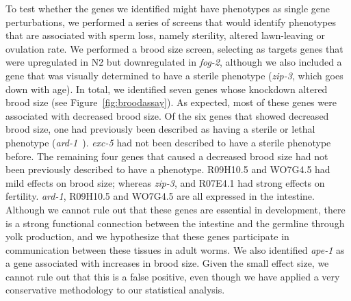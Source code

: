 \documentclass[10pt,letterpaper,twocolumn]{article}
\newcommand{\fog}{\emph{fog-2}}
\begin{document}
To test whether the genes we identified might have phenotypes as single gene perturbations, we performed a series of screens that would identify phenotypes that are associated with sperm loss, namely sterility, altered lawn-leaving or ovulation rate.
We performed a brood size screen, selecting as targets genes that were upregulated in N2 but downregulated in \fog{}, although we also included a gene that was visually determined to have a sterile phenotype (\emph{zip-3}, which goes down with age). In total, we identified seven genes whose knockdown altered brood size (see Figure~\ref{fig:broodassay}). As expected, most of these genes were associated with decreased brood size. Of the six genes that showed decreased brood size, one had previously been described as having a sterile or lethal phenotype (\emph{ard-1}~\cite{Simmer2003}). \emph{exc-5} had not been described to have a sterile phenotype before. The remaining four genes that caused a decreased brood size had not been previously described to have a phenotype. R09H10.5 and WO7G4.5 had mild effects on brood size; whereas \emph{zip-3}, and R07E4.1 had strong effects on fertility. \emph{ard-1}, R09H10.5 and WO7G4.5 are all expressed in the intestine.
Although we cannot rule out that these genes are essential in development, there is a strong functional connection between the intestine and the germline through yolk production\cite{DePina2011}, and we hypothesize that these genes participate in communication between these tissues in adult worms.
We also identified \emph{ape-1} as a gene associated with increases in brood size. Given the small effect size, we cannot rule out that this is a false positive, even though we have applied a very conservative methodology to our statistical analysis.
\end{document}
